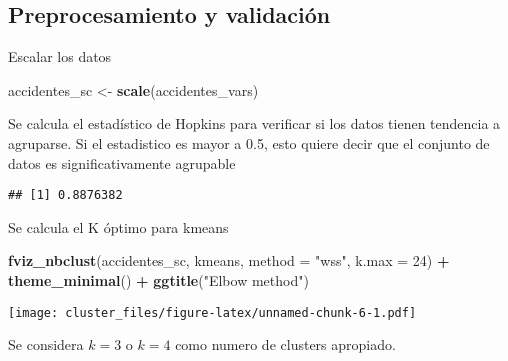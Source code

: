 \documentclass[
]{article}
\newenvironment{Shaded}{\begin{snugshade}}{\end{snugshade}}
\newcommand{\DataTypeTok}[1]{\textcolor[rgb]{0.13,0.29,0.53}{#1}}
\newcommand{\DecValTok}[1]{\textcolor[rgb]{0.00,0.00,0.81}{#1}}
\newcommand{\KeywordTok}[1]{\textcolor[rgb]{0.13,0.29,0.53}{\textbf{#1}}}
\newcommand{\NormalTok}[1]{#1}
\newcommand{\OperatorTok}[1]{\textcolor[rgb]{0.81,0.36,0.00}{\textbf{#1}}}
\newcommand{\OtherTok}[1]{\textcolor[rgb]{0.56,0.35,0.01}{#1}}
\newcommand{\StringTok}[1]{\textcolor[rgb]{0.31,0.60,0.02}{#1}}
\begin{document}
\hypertarget{preprocesamiento-y-validaciuxf3n}{%
\subsection{Preprocesamiento y
validación}\label{preprocesamiento-y-validaciuxf3n}}

Escalar los datos

\begin{Shaded}
\begin{Highlighting}[]
\NormalTok{accidentes_sc <-}\StringTok{ }\KeywordTok{scale}\NormalTok{(accidentes_vars)}
\end{Highlighting}
\end{Shaded}

Se calcula el estadístico de Hopkins para verificar si los datos tienen
tendencia a agruparse. Si el estadistico es mayor a 0.5, esto quiere
decir que el conjunto de datos es significativamente agrupable

\begin{Shaded}
\end{Shaded}

\begin{verbatim}
## [1] 0.8876382
\end{verbatim}

Se calcula el K óptimo para kmeans

\begin{Shaded}
\begin{Highlighting}[]
\KeywordTok{fviz_nbclust}\NormalTok{(accidentes_sc, kmeans, }\DataTypeTok{method =} \StringTok{"wss"}\NormalTok{, }\DataTypeTok{k.max =} \DecValTok{24}\NormalTok{) }\OperatorTok{+}\StringTok{ }\KeywordTok{theme_minimal}\NormalTok{() }\OperatorTok{+}\StringTok{ }\KeywordTok{ggtitle}\NormalTok{(}\StringTok{"Elbow method"}\NormalTok{)}
\end{Highlighting}
\end{Shaded}

\texttt{[image: cluster\_files/figure-latex/unnamed-chunk-6-1.pdf]}

Se considera \(k=3\) o \(k=4\) como numero de clusters apropiado.
\end{document}
